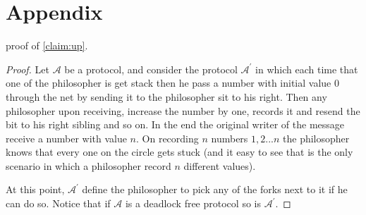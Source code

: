 \documentclass[manuscript,screen,review]{acmart}
\begin{document}
\section{Appendix}
proof of \cref{claim:up}. 
\begin{proof}
  Let $\mathcal{A}$ be a protocol, and consider the protocol $\mathcal{A}^{\prime}$ in which each time that one of the philosopher is get stack then he pass a number with initial value $0$ through the net by sending it to the philosopher sit to his right. Then any philosopher upon receiving, increase the number by one, records it and resend the bit to his right sibling and so on. In the end the original writer of the message receive a number with value $n$. On recording $n$ numbers $1 ,2 ... n$ the philosopher knows that every one on the circle gets stuck (and it easy to see that is the only scenario in which a philosopher record $n$ different values). 

  At this point, $\mathcal{A}^{\prime}$ define the philosopher to pick any of the forks next to it if he can do so. Notice that if $\mathcal{A}$ is a deadlock free protocol so is $\mathcal{A}^{\prime}$.         
  \end{proof}
\end{document}
